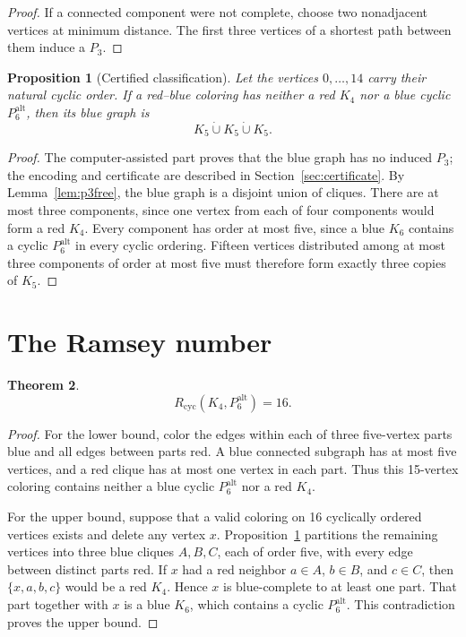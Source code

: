\documentclass[11pt]{article}
\newtheorem{theorem}{Theorem}
\newtheorem{proposition}[theorem]{Proposition}
\newcommand{\Rcyc}{R_{\mathrm{cyc}}}
\newcommand{\A}{P_6^{\mathrm{alt}}}
\begin{document}
\begin{proof}
If a connected component were not complete, choose two nonadjacent vertices
at minimum distance.  The first three vertices of a shortest path between
them induce a $P_3$.
\end{proof}

\begin{proposition}[Certified classification]\label{prop:classification}
Let the vertices $0,\ldots,14$ carry their natural cyclic order.  If a
red--blue coloring has neither a red $K_4$ nor a blue cyclic $\A$, then its
blue graph is
\[
 K_5\mathbin{\dot\cup}K_5\mathbin{\dot\cup}K_5.
\]
\end{proposition}

\begin{proof}
The computer-assisted part proves that the blue graph has no induced $P_3$;
the encoding and certificate are described in Section~\ref{sec:certificate}.
By Lemma~\ref{lem:p3free}, the blue graph is a disjoint union of cliques.
There are at most three components, since one vertex from each of four
components would form a red $K_4$.  Every component has order at most five,
since a blue $K_6$ contains a cyclic $P_6^{\mathrm{alt}}$ in every cyclic
ordering.  Fifteen vertices distributed among at most three components of
order at most five must therefore form exactly three copies of $K_5$.
\end{proof}

\section{The Ramsey number}

\begin{theorem}
\[
 \Rcyc(K_4,P_6^{\mathrm{alt}})=16.
\]
\end{theorem}

\begin{proof}
For the lower bound, color the edges within each of three five-vertex parts
blue and all edges between parts red.  A blue connected subgraph has at most
five vertices, and a red clique has at most one vertex in each part.  Thus this
15-vertex coloring contains neither a blue cyclic $P_6^{\mathrm{alt}}$ nor a
red $K_4$.

For the upper bound, suppose that a valid coloring on 16 cyclically ordered
vertices exists and delete any vertex $x$.  Proposition~\ref{prop:classification}
partitions the remaining vertices into three blue cliques $A,B,C$, each of
order five, with every edge between distinct parts red.  If $x$ had a red
neighbor $a\in A$, $b\in B$, and $c\in C$, then $\{x,a,b,c\}$ would be a red
$K_4$.  Hence $x$ is blue-complete to at least one part.  That part together
with $x$ is a blue $K_6$, which contains a cyclic $P_6^{\mathrm{alt}}$.  This
contradiction proves the upper bound.
\end{proof}
\end{document}
